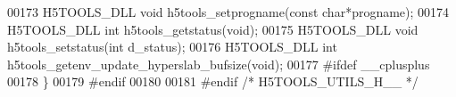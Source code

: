 \begin{DoxyCode}
00173 H5TOOLS\_DLL \textcolor{keywordtype}{void}     h5tools\_setprogname(\textcolor{keyword}{const} \textcolor{keywordtype}{char}*progname);
00174 H5TOOLS\_DLL \textcolor{keywordtype}{int}      h5tools\_getstatus(\textcolor{keywordtype}{void});
00175 H5TOOLS\_DLL \textcolor{keywordtype}{void}     h5tools\_setstatus(\textcolor{keywordtype}{int} d\_status);
00176 H5TOOLS\_DLL \textcolor{keywordtype}{int} h5tools\_getenv\_update\_hyperslab\_bufsize(\textcolor{keywordtype}{void});
00177 \textcolor{preprocessor}{#ifdef \_\_cplusplus}
00178 \}
00179 \textcolor{preprocessor}{#endif}
00180 
00181 \textcolor{preprocessor}{#endif  }\textcolor{comment}{/* H5TOOLS\_UTILS\_H\_\_ */}\textcolor{preprocessor}{}
\end{DoxyCode}
